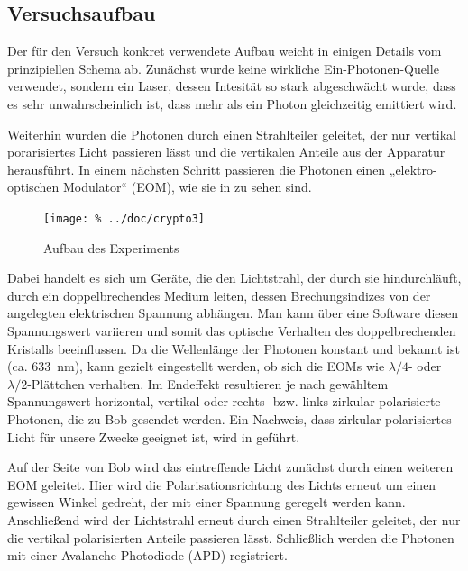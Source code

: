 \subsection{Versuchsaufbau}

Der für den Versuch konkret verwendete Aufbau weicht in einigen Details vom
prinzipiellen Schema ab. Zunächst wurde keine wirkliche Ein-Photonen-Quelle
verwendet, sondern ein Laser, dessen Intesität so stark abgeschwächt wurde,
dass es sehr unwahrscheinlich ist, dass mehr als ein Photon gleichzeitig
emittiert wird.

Weiterhin wurden die Photonen durch einen Strahlteiler geleitet, der nur
vertikal porarisiertes Licht passieren lässt und die vertikalen Anteile aus der
Apparatur herausführt. In einem nächsten Schritt passieren die Photonen einen 
„elektro-optischen Modulator“ (EOM), wie sie in  zu sehen sind.

\begin{figure}[htb]
 \centering
 \texttt{[image: \%
  ../doc/crypto3]}
 \caption{Aufbau des Experiments}
 \label{fig:aufbau}
\end{figure}

Dabei handelt es sich um Geräte, die den Lichtstrahl, der durch sie
hindurchläuft, durch ein doppelbrechendes Medium leiten, dessen
Brechungsindizes von der angelegten elektrischen Spannung abhängen. Man kann
über eine Software diesen Spannungswert variieren und somit das optische
Verhalten des doppelbrechenden Kristalls beeinflussen. Da die Wellenlänge der
Photonen konstant und bekannt ist (ca. \SI{633}{nm}), kann gezielt eingestellt
werden, ob sich die EOMs wie $λ/4$- oder $λ/2$-Plättchen verhalten. Im
Endeffekt resultieren je nach gewähltem Spannungswert horizontal, vertikal oder
rechts- bzw. links-zirkular polarisierte Photonen, die zu Bob gesendet werden.
Ein Nachweis, dass zirkular polarisiertes Licht für unsere Zwecke geeignet ist,
wird in \textcolor{red}{} geführt.

Auf der Seite von Bob wird das eintreffende Licht zunächst durch einen weiteren
EOM geleitet. Hier wird die Polarisationsrichtung des Lichts erneut um einen
gewissen Winkel gedreht, der mit einer Spannung geregelt werden kann.
Anschließend wird der Lichtstrahl erneut durch einen Strahlteiler geleitet, der
nur die vertikal polarisierten Anteile passieren lässt. Schließlich werden die
Photonen mit einer Avalanche-Photodiode (APD) registriert.